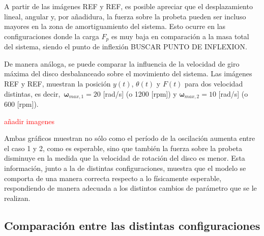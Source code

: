 A partir de las imágenes REF y REF, es posible apreciar que el desplazamiento lineal, angular y, por añadidura, la fuerza sobre la probeta pueden ser incluso mayores en la zona de amortiguamiento del sistema. Esto ocurre en las configuraciones donde la carga $F_p$ es muy baja en comparación a la masa total del sistema, siendo el punto de inflexión BUSCAR PUNTO DE INFLEXION. 

De manera análoga, se puede comparar la influencia de la velocidad de giro máxima del disco desbalanceado sobre el movimiento del sistema. Las imágenes REF y REF, muestran la posición $y(t)$, $\theta(t)$ y $F(t)$ para dos velocidad distintas, es decir, $\,\mathbf{\omega}_{max,1} = 20$ [rad/s] (o 1200 [rpm]) y $\mathbf{\omega}_{max,2} = 10$ [rad/s] (o 600 [rpm]).

\textcolor{red}{añadir imagenes}

Ambas gráficos muestran no sólo como el período de la oscilación aumenta entre el caso 1 y 2, como es esperable, sino que también la fuerza sobre la probeta disminuye en la medida que la velocidad de rotación del disco es menor. Esta información, junto a la de distintas configuraciones, muestra que el modelo se comporta de una manera correcta respecto a lo físicamente esperable, respondiendo de manera adecuada a los distintos cambios de parámetro que se le realizan.

\subsection{Comparación entre las distintas configuraciones} 


